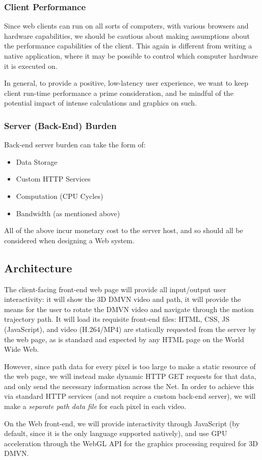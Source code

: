 \subsubsection{Client Performance}
Since web clients can run on all sorts of computers, with various browsers and hardware capabilities, we should be cautious about making assumptions about the performance capabilities of the client. This again is different from writing a native application, where it may be possible to control which computer hardware it is executed on.
\par In general, to provide a positive, low-latency user experience, we want to keep client run-time performance a prime consideration, and be mindful of the potential impact of intense calculations and graphics on such.

\subsubsection{Server (Back-End) Burden}
Back-end server burden can take the form of:
\begin{itemize}
    \item Data Storage
    \item Custom HTTP Services
    \item Computation (CPU Cycles)
    \item Bandwidth (as mentioned above)
\end{itemize}
All of the above incur monetary cost to the server host, and so should all be considered when designing a Web system.


\subsection {Architecture}
The client-facing front-end web page will provide all input/output user interactivity: it will show the 3D DMVN video and path, it will provide the means for the user to rotate the DMVN video and navigate through the motion trajectory path. It will load its requisite front-end files: HTML, CSS, JS (JavaScript), and video (H.264/MP4) are statically requested from the server by the web page, as is standard and expected by any HTML page on the World Wide Web.
\par However, since path data for every pixel is too large to make a static resource of the web page, we will instead make dynamic HTTP GET requests for that data, and only send the necessary information across the Net. In order to achieve this via standard HTTP services (and not require a custom back-end server), we will make a \emph{separate path data file} for each pixel in each video.
\par On the Web front-end, we will provide interactivity through JavaScript (by default, since it is the only language supported natively), and use GPU acceleration through the WebGL API for the graphics processing required for 3D DMVN.


